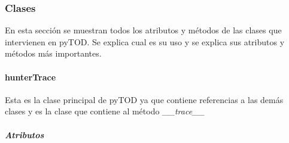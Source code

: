 \documentclass[12pt,legalpaper]{report}
\begin{document}
			\subsubsection{Clases}
			
En esta sección se muestran todos los atributos y métodos de las clases que intervienen en pyTOD.  Se explica cual es su uso y se explica sus atributos y métodos más importantes.			

				\paragraph{hunterTrace}
				
Esta es la clase principal de pyTOD ya que contiene referencias a las demás clases y es la clase que contiene al método \textit{\_\_trace\_\_}

					\subparagraph{Atributos}
					
\end{document}
